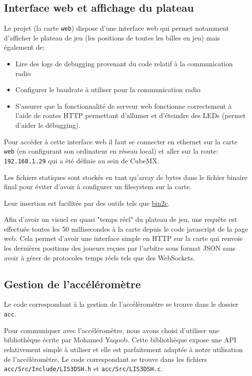 \documentclass[12pt,french]{article}
\begin{document}
\subsection{Interface web et affichage du plateau}

Le projet (la carte \texttt{web}) dispose d'une interface web qui permet notamment d'afficher le plateau de jeu (les positions de toutes les billes en jeu) mais également de:

\begin{itemize}
    \item Lire des logs de debugging provenant du code relatif à la communication radio
    \item Configurer le baudrate à utiliser pour la communication radio
    \item S'assurer que la fonctionnalité de serveur web fonctionne correctement à l'aide de routes HTTP permettant d'allumer et d'éteindre des LEDs (permet d'aider le débugging).
\end{itemize}

Pour accéder à cette interface web il faut se connecter en ethernet sur la carte \texttt{web} (en configurant son ordinateur en réseau local) et aller sur la route: \texttt{192.168.1.29} qui a été définie au sein de CubeMX.

Les fichiers statiques sont stockés en tant qu'array de bytes dans le fichier binaire final pour éviter d'avoir à configurer un filesystem sur la carte.

Leur insertion est facilitée par des outils tels que \href{https://github.com/gwilymk/bin2c}{bin2c}.

Afin d'avoir un visuel en quasi "temps réel" du plateau de jeu, une requête est effectuée toutes les 50 millisecondes à la carte depuis le code javascript de la page web. Cela permet d'avoir une interface simple en HTTP sur la carte qui renvoie les dernières positions des joueurs reçues par l'arbitre sous format JSON sans avoir à gérer de protocoles temps réels tels que des WebSockets.

\subsection{Gestion de l'accéléromètre}

Le code correspondant à la gestion de l'accéléromètre se trouve dans le dossier \texttt{acc}.

Pour communiquer avec l'accéléromètre, nous avons choisi d'utiliser une bibliothèque écrite par Mohamed Yaqoob. Cette bibliothèque expose une API relativement simple à utiliser et elle est parfaitement adaptée à notre utilisation de l'accéléromètre. Le code correspondant se trouve dans les fichiers \texttt{acc/Src/Include/LIS3DSH.h} et \texttt{acc/Src/LIS3DSH.c}.
\end{document}
